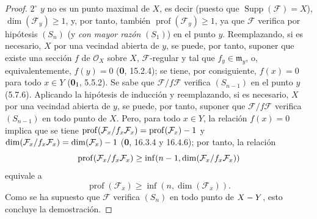 \begin{proof}
$2^\circ$ $y$ no es un punto maximal de $X$, es decir (puesto que
$\operatorname{Supp}(\mathcal F)=X$), $\dim(\mathcal F_y)\geq1$, y, por tanto, también
$\operatorname{prof}(\mathcal F_y)\geq1$, ya que $\mathcal F$ verifica por
hipótesis $(S_n)$ (y \emph{con mayor razón} $(S_1)$) en el punto $y$. Reemplazando, si es
necesario, $X$ por una vecindad abierta de $y$, se puede, por tanto, suponer
que existe una sección $f$ de $\mathcal O_X$ sobre $X$, $\mathcal F$-regular y
tal que $f_y\in\mathfrak m_y$, o, equivalentemente, $f(y)=0$ (\textbf 0, 15.2.4); se tiene,
por consiguiente, $f(x)=0$ para todo $x\in Y$ (\textbf{0}$_{\rm I}$, 5.5.2). Se sabe que
$\mathcal F/f\mathcal F$ verifica $(S_{n-1})$ en el punto $y$ (5.7.6).
Aplicando la hipótesis de inducción y reemplazando, si es necesario, $X$ por una
vecindad abierta de $y$, se puede, por tanto, suponer que
$\mathcal F/f\mathcal F$ verifica $(S_{n-1})$ en todo punto de $X$. Pero, para
todo $x\in Y$, la relación $f(x)=0$ implica que se tiene
$\operatorname{prof}(\mathcal F_x/f_x\mathcal F_x)=
\operatorname{prof}(\mathcal F_x)- 1$ y
$\dim(\mathcal F_x/f_x\mathcal F_x)=\dim(\mathcal F_x)- 1$
(\textbf 0, 16.3.4 y 16.4.6); por tanto, la relación
\[
\operatorname{prof}(\mathcal F_x/f_x\mathcal F_x)\geq
\inf(n- 1,\dim(\mathcal F_x/f_x\mathcal F_x))
\]
equivale a
\[
\operatorname{prof}(\mathcal F_x)\geq\inf(n,\dim(\mathcal F_x)).
\]
Como se ha supuesto que $\mathcal F$ verifica $(S_n)$ en todo punto de $X- Y$,
esto concluye la demostración.
\end{proof}
